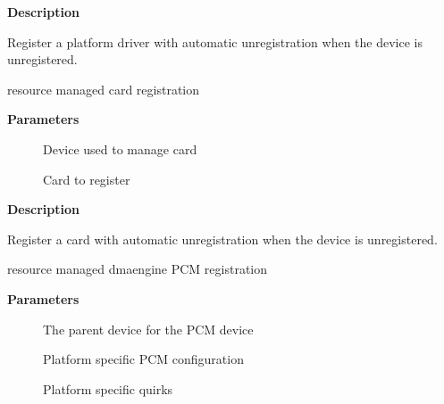 \documentclass[a4paper,8pt,english]{sphinxmanual}
\begin{document}
\textbf{Description}

Register a platform driver with automatic unregistration when the device is
unregistered.

\begin{fulllineitems}
\label{sound/kernel-api/alsa-driver-api:c.devm_snd_soc_register_card}
resource managed card registration

\end{fulllineitems}


\textbf{Parameters}
\begin{description}
\item[{}] \leavevmode
Device used to manage card

\item[{}] \leavevmode
Card to register

\end{description}

\textbf{Description}

Register a card with automatic unregistration when the device is
unregistered.

\begin{fulllineitems}
\label{sound/kernel-api/alsa-driver-api:c.devm_snd_dmaengine_pcm_register}
resource managed dmaengine PCM registration

\end{fulllineitems}


\textbf{Parameters}
\begin{description}
\item[{}] \leavevmode
The parent device for the PCM device

\item[{}] \leavevmode
Platform specific PCM configuration

\item[{}] \leavevmode
Platform specific quirks

\end{description}
\end{document}
